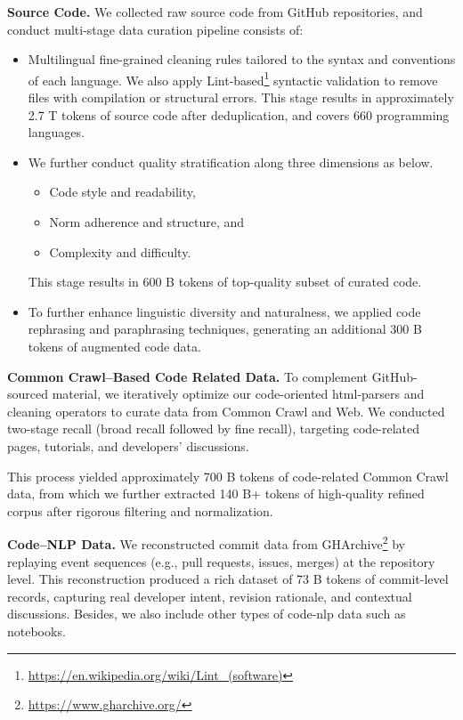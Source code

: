 {\bfseries Source Code.} We collected raw source code from GitHub repositories, and conduct multi-stage data curation pipeline consists of:
\begin{itemize}
\item Multilingual fine-grained cleaning rules tailored to the syntax and conventions of each language.
We also apply Lint-based\footnote{\url{https://en.wikipedia.org/wiki/Lint_(software)}} syntactic validation to remove files with compilation or structural errors. This stage results in approximately 2.7 T tokens of source code after deduplication, and covers 660 programming languages.
\item We further conduct quality stratification along three dimensions as below.
    \begin{itemize}
        \item Code style and readability,
        \item Norm adherence and structure, and
        \item Complexity and difficulty.
    \end{itemize}
    This stage results in 600 B tokens of top-quality subset of curated code.
\item To further enhance linguistic diversity and naturalness, we applied code rephrasing and paraphrasing techniques, generating an additional 300 B tokens of augmented code data.
\end{itemize}

{\bfseries Common Crawl–Based Code Related Data. }
To complement GitHub-sourced material, we iteratively optimize our code-oriented html-parsers and cleaning operators to curate data from Common Crawl and Web. We conducted two-stage recall (broad recall followed by fine recall), targeting code-related pages, tutorials, and developers' discussions.

This process yielded approximately 700 B tokens of code-related Common Crawl data, from which we further extracted 140 B+ tokens of high-quality refined corpus after rigorous filtering and normalization.

{\bfseries Code–NLP Data. }
We reconstructed commit data from GHArchive\footnote{\url{https://www.gharchive.org/}} by replaying event sequences (e.g., pull requests, issues, merges) at the repository level. This reconstruction produced a rich dataset of 73 B tokens of commit-level records, capturing real developer intent, revision rationale, and contextual discussions. Besides, we also include other types of code-nlp data such as notebooks.

